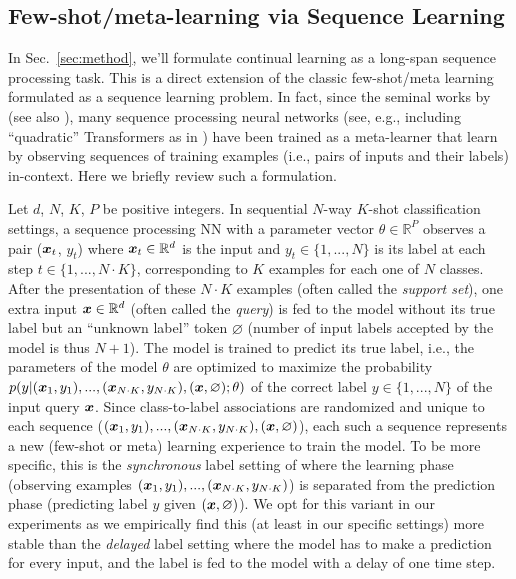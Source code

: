\documentclass{article}
\begin{document}
\subsection{Few-shot/meta-learning via Sequence Learning}
\label{sec:fsl}
In Sec.~\ref{sec:method}, we'll formulate continual learning as a long-span sequence processing task.
This is a direct extension of the classic few-shot/meta learning formulated as a sequence learning problem.
In fact, since the seminal works by \citet{hochreiter2001learning, younger1999fixed, cotter1991learning, cotter1990fixed} (see also \citet{naik1992meta}),
many sequence processing neural networks  (see, e.g., \citet{bosc2015learning, SantoroBBWL16, duan2016rl, wang2016learning, munkhdalai2017meta, munkhdalai2018metalearning, miconi18a, miconi2018backpropamine, MunkhdalaiSWT19, KirschS21, sandler21, huisman2023lstms} including ``quadratic'' Transformers \citep{trafo} as in \citet{mishra2018a}) have been trained as 
a meta-learner \citep{schmidhuber1987evolutionary, Schmidhuber:92selfref}
that learn by observing sequences of training examples (i.e., pairs of inputs and their labels) in-context.
Here we briefly review such a formulation.

Let $d$, $N$, $K$, $P$ be positive integers.
In sequential $N$-way $K$-shot classification settings, a sequence processing NN with a parameter vector $\theta \in \mathbb{R}^P$ observes a pair (${\bm{x}}_t$, $y_t$) where ${\bm{x}}_t \in \mathbb{R}^{d}$ is the input and $y_t \in \{1,..., N\}$ is its label at each step $t \in \{1, ..., N\cdot K\}$, corresponding to $K$ examples for each one of $N$ classes.
After the presentation of these $N\cdot K$ examples (often called the \textit{support set}), one extra input ${\bm{x}} \in \mathbb{R}^{d}$ (often called the \textit{query}) is fed to the model without its true label but an ``unknown label'' token $\varnothing$ (number of input labels accepted by the model is thus $N+1$).
The model is trained to predict its true label, i.e., the parameters of the model $\theta$ are optimized to maximize the probability $p(y|({\bm{x}}_1,y_1), ..., ({\bm{x}}_{N\cdot K},y_{N\cdot K}), ({\bm{x}}, \varnothing);\theta)$ of the correct label $y \in \{1,..., N\}$ of the input query ${\bm{x}}$.
Since class-to-label associations are randomized and unique to each sequence ($({\bm{x}}_1,y_1), ..., ({\bm{x}}_{N\cdot K},y_{N\cdot K}), ({\bm{x}}, \varnothing)$), each such a sequence represents a new (few-shot or meta) learning experience to train the model.
To be more specific, this is the \textit{synchronous} label setting of \citet{mishra2018a} where the learning phase (observing examples $({\bm{x}}_1,y_1), ..., ({\bm{x}}_{N\cdot K},y_{N\cdot K})$) is separated from the prediction phase (predicting label $y$ given $({\bm{x}}, \varnothing)$).
We opt for this variant in our experiments as we empirically find this (at least in our specific settings) more stable than the \textit{delayed} label setting \citep{hochreiter2001learning} where the model has to make a prediction for every input, and the label is fed to the model with a delay of one time step.
\end{document}
